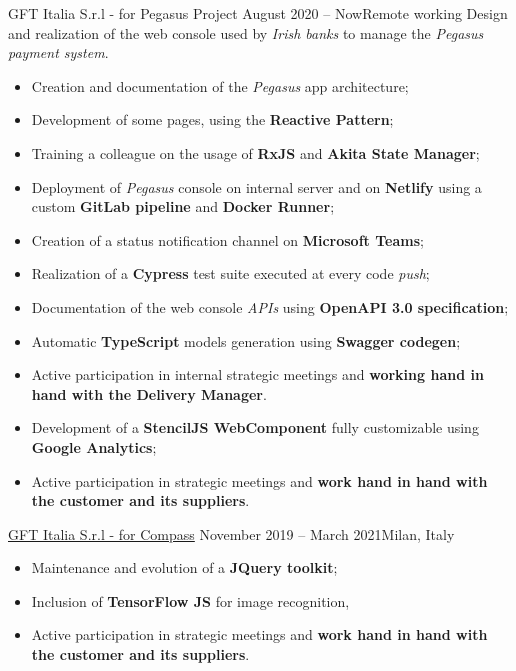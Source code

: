 \documentclass[10pt,a4paper]{altacv}
\begin{document}
{GFT Italia S.r.l - for Pegasus Project}
{August 2020 -- Now}{Remote working}
Design and realization of the web console used by \textit{Irish banks} to manage the \textit{Pegasus payment system}.
\newline
\begin{adjustwidth}{0cm}{-8cm}
\begin{itemize}
	\item Creation and documentation of the \textit{Pegasus} app architecture;
	\item Development of some pages, using the \textbf{Reactive Pattern};
	\item Training a colleague on the usage of \textbf{RxJS} and \textbf{Akita State Manager};
	\item Deployment of \textit{Pegasus} console on internal server and on \textbf{Netlify} using a custom \textbf{GitLab pipeline} and \textbf{Docker Runner};
	\item Creation of a status notification channel on \textbf{Microsoft Teams};
	\item Realization of a \textbf{Cypress} test suite executed at every code \textit{push};
	\item Documentation of the web console \textit{APIs} using \textbf{OpenAPI 3.0 specification};
	\item Automatic \textbf{TypeScript} models generation using \textbf{Swagger codegen};
	\item Active participation in internal strategic meetings and \textbf{working hand in hand with the Delivery Manager}.
\end{itemize}
\divider

\begin{itemize}
	\item Development of a \textbf{StencilJS WebComponent} fully customizable using \textbf{Google Analytics};
	\item Active participation in strategic meetings and \textbf{work hand in hand with the customer and its suppliers}.
\end{itemize}

\divider

{\href{https://www.compass.it/}{GFT Italia S.r.l - for Compass}}
{November 2019 -- March 2021}{Milan, Italy}
\begin{itemize}
	\item Maintenance and evolution of a \textbf{JQuery toolkit};
	\item Inclusion of \textbf{TensorFlow JS} for image recognition,
	\item Active participation in strategic meetings and \textbf{work hand in hand with the customer and its suppliers}.
\end{itemize}


\end{adjustwidth}
\end{document}

